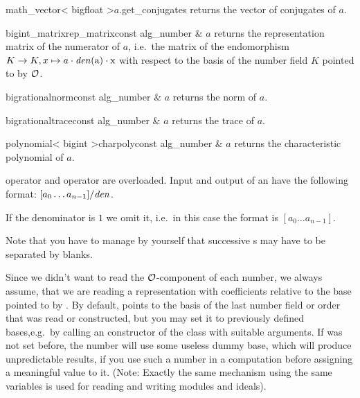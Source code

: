 \begin{cfcode}{math_vector< bigfloat >}{$a$.get_conjugates}{}
  returns the vector of conjugates of $a$.
\end{cfcode}

\begin{fcode}{bigint_matrix}{rep_matrix}{const alg_number & $a$}
  returns the representation matrix of the numerator of $a$, i.e.~the matrix of the endomorphism
  $K \rightarrow K, x \mapsto a \cdot \rm \mathit{den}(a) \cdot x$ with respect to the basis of the
  number field $K$ pointed to by $\mathcal{O}$.
\end{fcode}

\begin{fcode}{bigrational}{norm}{const alg_number & $a$}
  returns the norm of $a$.
\end{fcode}

\begin{fcode}{bigrational}{trace}{const alg_number & $a$}
  returns the trace of $a$.
\end{fcode}

\begin{fcode}{polynomial< bigint >}{charpoly}{const alg_number & $a$}
  returns the characteristic polynomial of $a$.
\end{fcode}



\IO

 operator \code{>>} and  operator \code{<<} are overloaded.  Input
and output of an  have the following format: $[a_0 \dots a_{n-1}] / \mathit{den}$.

If the denominator is $1$ we omit it, i.e.~in this case the format is $[a_0 \dots a_{n-1}].$

Note that you have to manage by yourself that successive s may have to be
separated by blanks.

Since we didn't want to read the $\mathcal{O}$-component of each number, we always assume, that we are
reading a representation with coefficients relative to the base pointed to by
.  By default,  points to the basis of
the last number field or order that was read or constructed, but you may set it to previously
defined bases,e.g.~by calling an constructor of the class  with suitable arguments.
If  was not set before, the number will use some useless dummy base,
which will produce unpredictable results, if you use such a number in a computation before
assigning a meaningful value to it.  (Note: Exactly the same mechanism using the same variables
is used for reading and writing modules and ideals).


